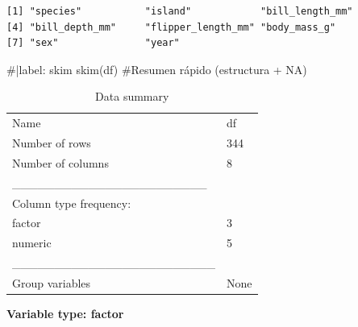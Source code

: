 \documentclass[
  spanish,
  11pt,
  a4paper,
  DIV=11,
  numbers=noendperiod]{scrartcl}
\newenvironment{Shaded}{\begin{snugshade}}{\end{snugshade}}
\newcommand{\CommentTok}[1]{\textcolor[rgb]{0.37,0.37,0.37}{#1}}
\newcommand{\FunctionTok}[1]{\textcolor[rgb]{0.28,0.35,0.67}{#1}}
\newcommand{\NormalTok}[1]{\textcolor[rgb]{0.00,0.23,0.31}{#1}}
\begin{document}
\begin{verbatim}
[1] "species"           "island"            "bill_length_mm"   
[4] "bill_depth_mm"     "flipper_length_mm" "body_mass_g"      
[7] "sex"               "year"             
\end{verbatim}

\begin{Shaded}
\begin{Highlighting}[numbers=left,,]
\CommentTok{\#|label: skim}
\FunctionTok{skim}\NormalTok{(df) }\CommentTok{\#Resumen rápido (estructura + NA)}
\end{Highlighting}
\end{Shaded}

\begin{longtable}[]{@{}ll@{}}
\caption{Data summary}\tabularnewline
\toprule\noalign{}
\endfirsthead
\endhead
\bottomrule\noalign{}
\endlastfoot
Name & df \\
Number of rows & 344 \\
Number of columns & 8 \\
\_\_\_\_\_\_\_\_\_\_\_\_\_\_\_\_\_\_\_\_\_\_\_ & \\
Column type frequency: & \\
factor & 3 \\
numeric & 5 \\
\_\_\_\_\_\_\_\_\_\_\_\_\_\_\_\_\_\_\_\_\_\_\_\_ & \\
Group variables & None \\
\end{longtable}

\textbf{Variable type: factor}
\end{document}
